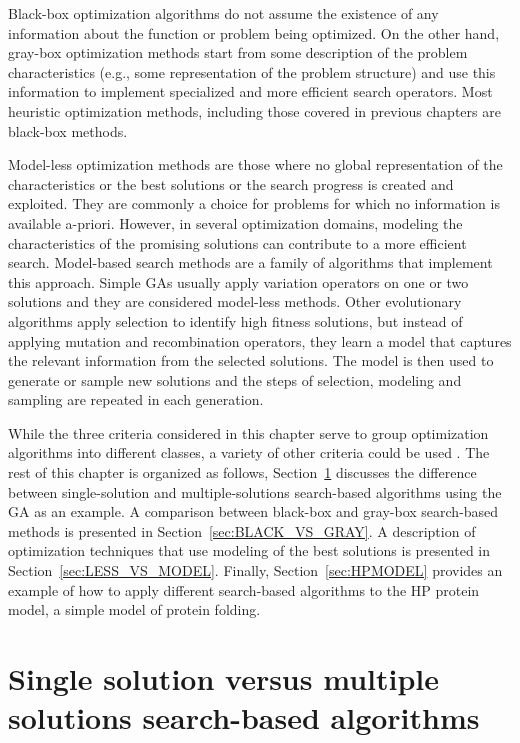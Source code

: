  Black-box optimization algorithms do not assume the existence of any information about the function or problem being optimized. On the other hand, gray-box optimization methods start from some description of the problem characteristics (e.g., some representation of the problem structure) and use this information to implement specialized and more efficient search operators. Most heuristic optimization methods, including those covered in previous chapters are black-box methods. 


 Model-less optimization methods are those where no global representation of the characteristics or the best solutions or the search progress is created and exploited. They are commonly a choice for problems for which no information is available a-priori. However, in several optimization domains, modeling the characteristics of the promising solutions can contribute to a more efficient search. Model-based search methods are a family of algorithms that implement this approach. Simple GAs  usually apply variation operators on one or two solutions and they are considered model-less methods.  Other evolutionary algorithms apply selection to identify high fitness solutions, but instead of applying mutation and recombination operators, they learn a model that captures the relevant information from the selected solutions. The model is then used to generate or sample new solutions and the steps of selection, modeling and sampling are repeated in each generation. 

 While the three criteria considered in this chapter serve to group optimization algorithms into different classes, a variety of other criteria could be used \cite{Stork_et_al:2020}. The rest of this chapter is organized as follows, Section~\ref{sec:SINGLE_VS_POP} discusses the difference between single-solution and multiple-solutions search-based algorithms using the GA as an example.  A comparison between black-box and gray-box search-based methods is presented in Section~\ref{sec:BLACK_VS_GRAY}. A description of optimization techniques that use modeling of the best solutions is presented in Section~\ref{sec:LESS_VS_MODEL}. Finally, Section~\ref{sec:HPMODEL} provides an example of how to apply different search-based algorithms to the HP protein model, a simple model of protein folding. 


 \section{Single solution versus multiple solutions search-based algorithms} \label{sec:SINGLE_VS_POP}

